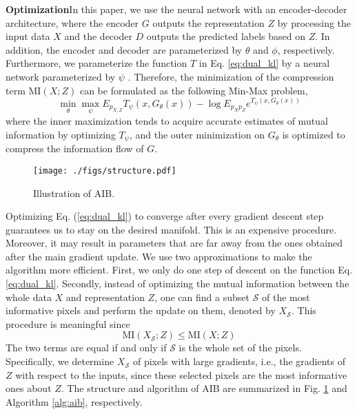 \documentclass[10pt,journal,compsoc]{IEEEtran}
\begin{document}
\noindent \textbf{Optimization}\quad In this paper, we use the neural network with an encoder-decoder architecture, where the encoder $G$ outputs the representation $Z$ by processing the input data $X$ and the decoder $D$ outputs the predicted labels based on $Z$. In addition, the encoder and decoder are parameterized by $\theta$ and $\phi$, respectively. Furthermore, we parameterize the function $T$ in Eq. \ref{eq:dual_kl} by a neural network parameterized by $\psi$ \cite{Belghazi2018MutualIN}. Therefore, the minimization of the compression term $\mathrm{MI}(X; Z)$ can be formulated as the following Min-Max problem,
\begin{equation*}
\min_{\theta}\max_{\psi}E_{p_{X,Z}}T_{\psi}(x,G_{\theta}(x))-\log E_{p_{X}p_{Z}}e^{T_{\psi}(x,G_{\theta}(x))}
\end{equation*}
where the inner maximization tends to acquire accurate estimates of mutual information by optimizing $T_{\psi}$, and the outer minimization on $G_{\theta}$ is optimized to compress the information flow of $G$.
\begin{figure}
  \centering
  \texttt{[image: ./figs/structure.pdf]}
  \caption{Illustration of AIB.}
  \label{img:structure}
\end{figure}
Optimizing Eq. (\ref{eq:dual_kl}) to converge after every gradient descent step guarantees us to stay on the desired manifold. This is an expensive procedure. Moreover, it may result in parameters that are far away from the ones obtained after the main gradient update.
We use two approximations to make the algorithm more efficient. First, we only do one step of descent on the function Eq. \ref{eq:dual_kl}. Secondly, instead of optimizing the mutual information between the whole data $X$ and representation $Z$, one can find a subset $\mathcal{S}$ of the most informative pixels and perform the update on them, denoted by $X_{\mathcal{S}}$. This procedure is meaningful since
\begin{equation}
\mathrm{MI}(X_{\mathcal{S}};Z) \leq \mathrm{MI}(X; Z)
\end{equation}
The two terms are equal if and only if $\mathcal{S}$ is the whole set of the pixels. Specifically, we determine $X_{\mathcal{S}}$ of pixels with large gradients, i.e., the gradients of $Z$ with respect to the inputs, since these selected pixels are the most informative ones about $Z$. The structure and algorithm of AIB are summarized in Fig. \ref{img:structure} and Algorithm \ref{alg:aib}, respectively.
\end{document}

